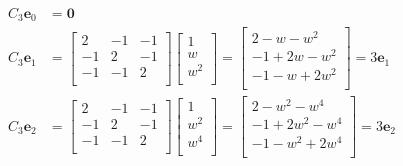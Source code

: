 \documentclass[a4paper]{article}
\begin{document}
\begin{align*}
	C_{3}\pmb{e}_{0} & = \pmb{0} \\
	C_{3}\pmb{e}_{1} & = \begin{bmatrix}
		2 & -1 & -1 \\
		-1 & 2 & -1 \\
		-1 & -1 & 2 \\
	\end{bmatrix}
	\begin{bmatrix}
		1 \\
		w \\
		w^{2} \\
	\end{bmatrix} = 
	\begin{bmatrix}
		2 - w - w^{2} \\
		-1 + 2w - w^{2} \\
		-1 -w + 2w^{2} \\
	\end{bmatrix} = 3 \pmb{e}_{1} \\
	C_{3}\pmb{e}_{2} & = \begin{bmatrix}
		2 & -1 & -1 \\
		-1 & 2 & -1 \\
		-1 & -1 & 2 \\
	\end{bmatrix}
	\begin{bmatrix}
		1 \\
		w^{2} \\
		w^{4} \\
	\end{bmatrix} = 
	\begin{bmatrix}
		2 - w^{2} - w^{4} \\
		-1 + 2w^{2} - w^{4} \\
		-1 - w^{2} + 2w^{4} \\
	\end{bmatrix} = 3 \pmb{e}_{2}
\end{align*}
\end{document}
